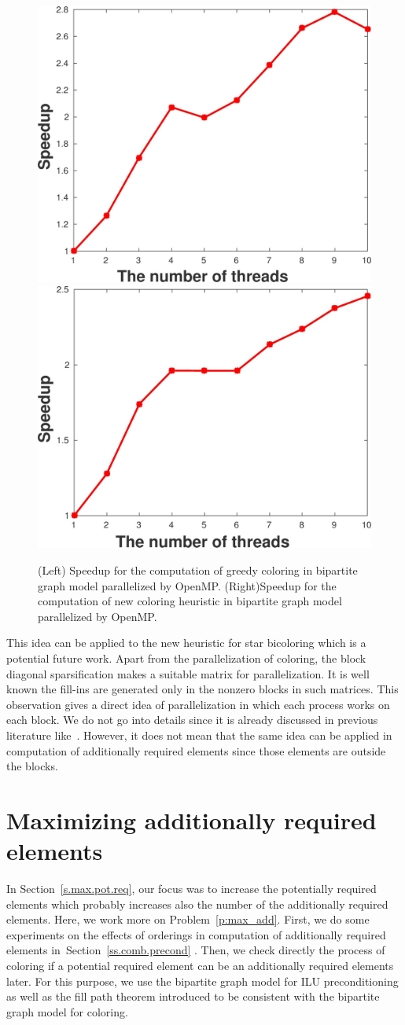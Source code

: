 \documentclass[12pt, twoside,a4paper,toc=bibliography]{scrbook}
\newcommand{\secref}[1]{Section~\protect\ref{#1}}
\begin{document}
\begin{figure}
\includegraphics[width=0.44\linewidth]{ths_spd.jpg}\hfill
\includegraphics[width=0.47\linewidth]{ths_spd2.jpg}
\caption{
(Left) Speedup for the computation of greedy coloring in bipartite graph model parallelized by OpenMP.
(Right)Speedup for the computation of new coloring heuristic in bipartite graph model parallelized by OpenMP.
}
\label{speedups}
\end{figure}

This idea can be applied to the new heuristic for star bicoloring which is a potential future work.
Apart from the parallelization of coloring, the block diagonal sparsification makes a suitable
matrix for parallelization. It is well known the fill-ins are generated only in the nonzero blocks in such matrices. This observation gives a direct idea of parallelization in which each process
works on each block. We do not go into details since it is already discussed in previous literature like~\cite{parblockilu}. However, it does not mean that the same idea can be applied in computation of
additionally required elements since those elements are outside the blocks.


\section{Maximizing additionally required elements}
\label{s.max.add.req}
In \secref{s.max.pot.req}, our focus was to increase the potentially required elements
which probably increases also the number of the additionally required elements.
Here, we work more on Problem~\ref{p:max_add}.
First, we do some experiments on the effects of orderings in computation of additionally
required elements in~\secref{ss.comb.precond} . 
Then, we check directly the process of coloring
if a potential required element can be an additionally required elements later.
For this purpose, we use the bipartite graph model for ILU preconditioning
as well as the fill path theorem introduced
to be consistent with the bipartite graph model for coloring.
\end{document}
